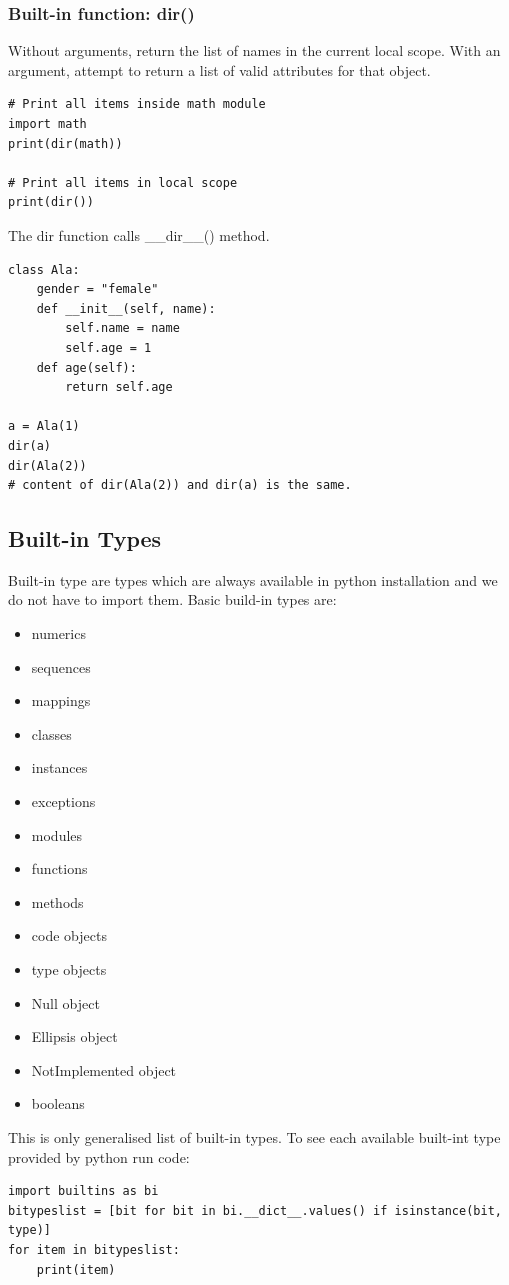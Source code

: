\documentclass{article}
\begin{document}
	\subsubsection{Built-in function: dir()}
Without arguments, return the list of names in the current local scope. With an argument, attempt to return a list of valid attributes for that object.
	\begin{lstlisting}[style=pystyle]
# Print all items inside math module
import math
print(dir(math))

# Print all items in local scope
print(dir())
	\end{lstlisting}
The dir function calls \_\_dir\_\_() method.
	\begin{lstlisting}[style=pystyle]
class Ala:
    gender = "female"
    def __init__(self, name):
        self.name = name
        self.age = 1
    def age(self):
        return self.age

a = Ala(1)
dir(a)
dir(Ala(2))
# content of dir(Ala(2)) and dir(a) is the same. 
	\end{lstlisting}



	\newpage
	\subsection{Built-in Types}
	Built-in type are types which are always available in python installation and we do not have to import them. Basic build-in types are:
	\begin{itemize}
	\item numerics
	\item sequences
	\item mappings
	\item classes
	\item instances
	\item exceptions
	\item modules
	\item functions
	\item methods
	\item code objects
	\item type objects
	\item Null object
	\item Ellipsis object
	\item NotImplemented object
	\item booleans
	\end{itemize}
	This is only generalised list of built-in types. To see each available built-int type provided by python run code:
	\begin{lstlisting}[style=pystyle]
import builtins as bi
bitypeslist = [bit for bit in bi.__dict__.values() if isinstance(bit, type)]
for item in bitypeslist:
    print(item)
	\end{lstlisting}
	
\end{document}
